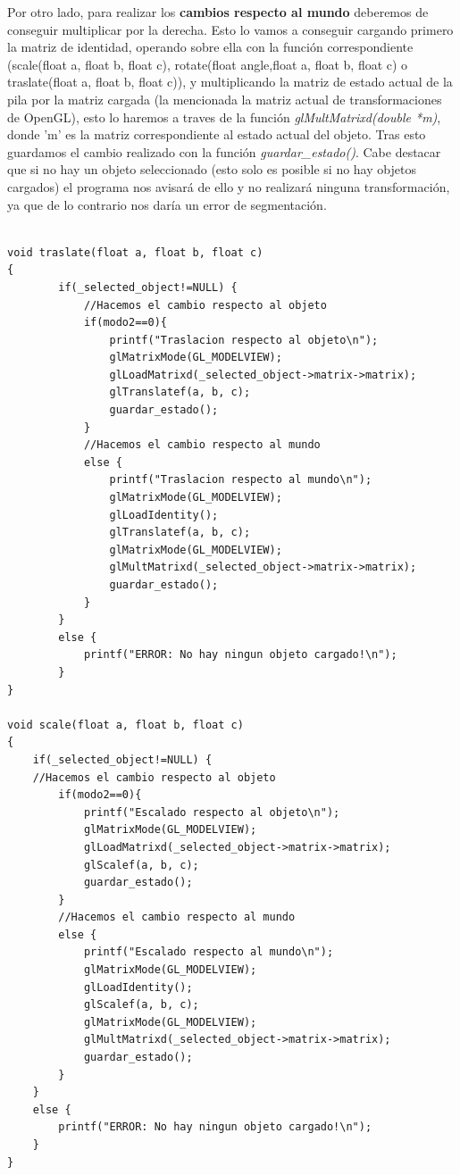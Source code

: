 \documentclass[12pt,a4paper]{article}
\begin{document}
\begin{enumerate}
Por otro lado, para realizar los \textbf{cambios respecto al mundo} deberemos de conseguir multiplicar por la derecha. Esto lo vamos a conseguir cargando primero la matriz de identidad, operando sobre ella con la función correspondiente (scale(float a, float b, float c), rotate(float angle,float a, float b, float c) o traslate(float a, float b, float c)), y multiplicando la matriz de estado actual de la pila por la matriz cargada (la mencionada la matriz actual de transformaciones de OpenGL), esto lo haremos a traves de la función \textit{glMultMatrixd(double *m)}, donde 'm' es la matriz correspondiente al estado actual del objeto. Tras esto guardamos el cambio realizado con la función \textit{guardar\_estado()}.\newline
Cabe destacar que si no hay un objeto seleccionado (esto solo es posible si no hay objetos cargados) el programa nos avisará de ello y no realizará ninguna transformación, ya que de lo contrario nos daría un error de segmentación.\newline


\begin{lstlisting}

void traslate(float a, float b, float c)
{
        if(_selected_object!=NULL) {
            //Hacemos el cambio respecto al objeto
            if(modo2==0){
                printf("Traslacion respecto al objeto\n");
                glMatrixMode(GL_MODELVIEW);
                glLoadMatrixd(_selected_object->matrix->matrix);
                glTranslatef(a, b, c);
                guardar_estado();
            }
            //Hacemos el cambio respecto al mundo
            else {
                printf("Traslacion respecto al mundo\n");
                glMatrixMode(GL_MODELVIEW);
                glLoadIdentity();
                glTranslatef(a, b, c);
                glMatrixMode(GL_MODELVIEW);
                glMultMatrixd(_selected_object->matrix->matrix);
                guardar_estado();
            }
        }
        else {
            printf("ERROR: No hay ningun objeto cargado!\n");
        }
}

void scale(float a, float b, float c)
{
    if(_selected_object!=NULL) {
    //Hacemos el cambio respecto al objeto
        if(modo2==0){
            printf("Escalado respecto al objeto\n");
            glMatrixMode(GL_MODELVIEW);
            glLoadMatrixd(_selected_object->matrix->matrix);
            glScalef(a, b, c);
            guardar_estado();
        }
        //Hacemos el cambio respecto al mundo
        else {
            printf("Escalado respecto al mundo\n");
            glMatrixMode(GL_MODELVIEW);
            glLoadIdentity();
            glScalef(a, b, c);
            glMatrixMode(GL_MODELVIEW);
            glMultMatrixd(_selected_object->matrix->matrix);
            guardar_estado();
        }
    }
    else {
        printf("ERROR: No hay ningun objeto cargado!\n");
    }
}


\end{lstlisting}
\end{enumerate}
\end{document}

